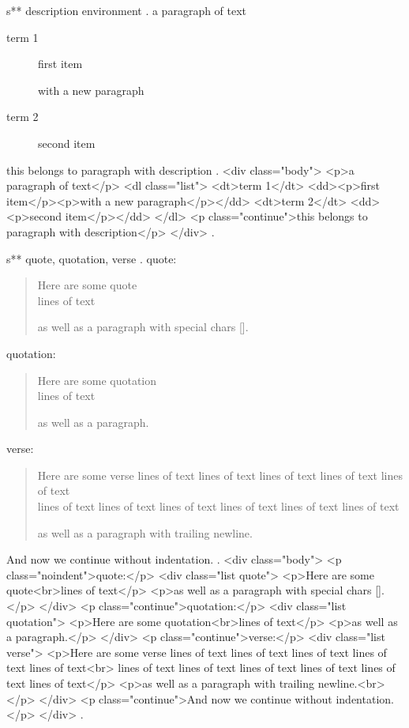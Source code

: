 s** description environment
.
a paragraph of text

\begin{description}
    \item[term 1] first item

        with a new paragraph
    \item[term 2] second item
\end{description}
this belongs to paragraph with description
.
<div class="body">
<p>a paragraph of text</p>
<dl class="list">
<dt>term 1</dt>
<dd><p>ﬁrst item</p><p>with a new paragraph</p></dd>
<dt>term 2</dt>
<dd><p>second item</p></dd>
</dl>
<p class="continue">this belongs to paragraph with description</p>
</div>
.

s** quote, quotation, verse
.
\noindent quote:
\begin{quote}
    Here are some quote\\
    lines of text

    as well as a paragraph with special chars [].
\end{quote}
quotation:
\begin{quotation}
    Here are some quotation\\
    lines of text

    as well as a paragraph.
\end{quotation}
verse:
\begin{verse}
    Here are some verse lines of text lines of text lines of text lines of text lines of text \\
    lines of text lines of text lines of text lines of text lines of text lines of text

    as well as a paragraph with trailing newline.\\
\end{verse}
And now we continue without indentation.
.
<div class="body">
<p class="noindent">quote:</p>
<div class="list quote">
<p>Here are some quote<br>lines of text</p>
<p>as well as a paragraph with special chars [].</p>
</div>
<p class="continue">quotation:</p>
<div class="list quotation">
<p>Here are some quotation<br>lines of text</p>
<p>as well as a paragraph.</p>
</div>
<p class="continue">verse:</p>
<div class="list verse">
<p>Here are some verse lines of text lines of text lines of text lines of text lines of text<br>
lines of text lines of text lines of text lines of text lines of text lines of text</p>
<p>as well as a paragraph with trailing newline.<br></p>
</div>
<p class="continue">And now we continue without indentation.</p>
</div>
.


